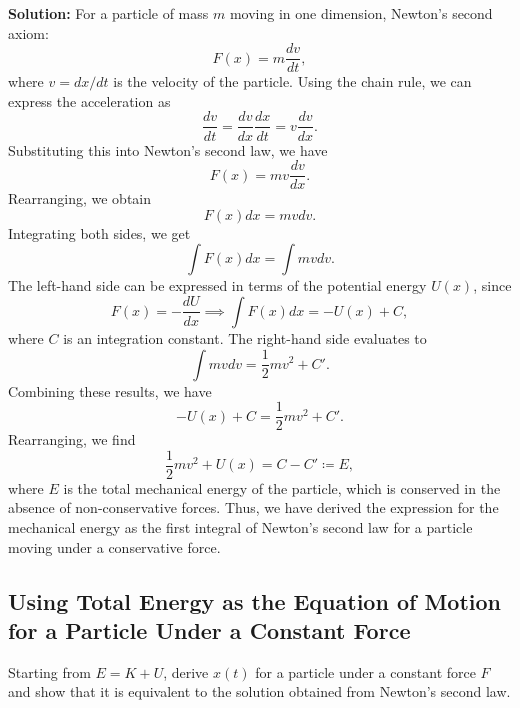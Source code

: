 \documentclass[12pt]{article}
\begin{document}
\textbf{Solution:} For a particle of mass $m$ moving in one dimension, Newton's second axiom:
\begin{equation}
    F(x) = m\frac{dv}{dt},
\end{equation}
where $v = dx/dt$ is the velocity of the particle. Using the chain rule, we can express the acceleration as
\begin{equation}
    \frac{dv}{dt} = \frac{dv}{dx}\frac{dx}{dt} = v\frac{dv}{dx}.
\end{equation}
Substituting this into Newton's second law, we have
\begin{equation}
    F(x) = m v \frac{dv}{dx}.
\end{equation}
Rearranging, we obtain
\begin{equation}
    F(x) dx = m v dv.
\end{equation}
Integrating both sides, we get
\begin{equation}
    \int F(x) dx = \int m v dv.
\end{equation}
The left-hand side can be expressed in terms of the potential energy $U(x)$, since
\begin{equation}
    F(x) = -\frac{dU}{dx} \implies \int F(x) dx = -U(x) + C,
\end{equation}
where $C$ is an integration constant. The right-hand side evaluates to
\begin{equation}
    \int m v dv = \frac{1}{2} m v^2 + C'.
\end{equation}
Combining these results, we have
\begin{equation}
    -U(x) + C = \frac{1}{2} m v^2 + C'.
\end{equation}
Rearranging, we find
\begin{equation}
    \frac{1}{2} m v^2 + U(x) = C - C' \coloneqq E,
\end{equation}
where $E$ is the total mechanical energy of the particle, which is conserved in the absence of non-conservative forces. Thus, we have derived the expression for the mechanical energy as the first integral of Newton's second law for a particle moving under a conservative force.



\subsection{Using Total Energy as the Equation of Motion for a Particle Under a Constant Force}

Starting from $E = K + U$, derive $x(t)$ for a particle under a constant force $F$ and show that it is equivalent to the solution obtained from Newton's second law.
\end{document}
